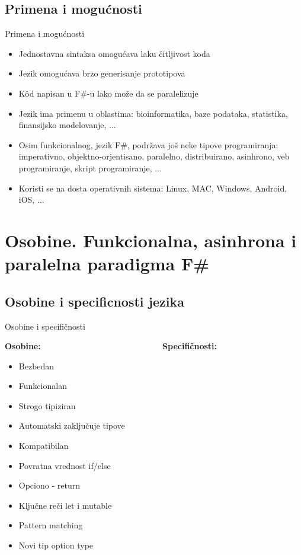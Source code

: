 \documentclass{beamer}
\begin{document}
\subsection*{Primena i mogućnosti}
\begin{frame}{Primena i mogućnosti}

\begin{itemize}
\item Jednostavna sintaksa omogućava laku čitljivost koda
\item Jezik omogućava brzo generisanje prototipova
\item Kôd napisan u F\#-u lako može da se paralelizuje
\item Jezik ima primenu u oblastima: bioinformatika, baze podataka, statistika, finansijsko modelovanje, ...
\item Osim funkcionalnog, jezik F\#, podržava još neke tipove programiranja: imperativno, objektno-orjentisano, paralelno, distribuirano, asinhrono, veb programiranje, skript programiranje, ...
\item Koristi se na dosta operativnih sistema: Linux, MAC, Windows, Android, iOS, ...
\end{itemize}

\end{frame}

\section{Osobine. Funkcionalna, asinhrona i paralelna paradigma F\#}
\subsection*{Osobine i specificnosti jezika}
\begin{frame}{Osobine i specifičnosti}
\begin{center}

\textbf{Osobine:} ~~~~~~~~~~~~~~~~~~~~~~~~~~~~ \textbf{Specifičnosti:}
\end{center}
\begin{multicols}{2}
\begin{itemize}
  \item Bezbedan
  \item Funkcionalan
  \item Strogo tipiziran
  \item Automatski zaključuje tipove
  \item Kompatibilan
  \item Povratna vrednost if/else
  \item Opciono - return
  \item Ključne reči let i mutable
  \item Pattern matching
  \item Novi tip option type
\end{itemize}
\end{multicols}

\end{frame}
\end{document}
